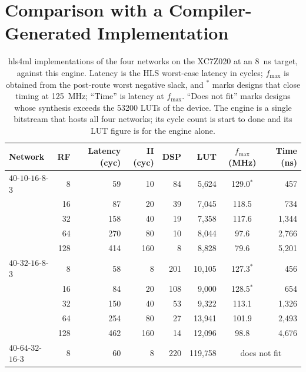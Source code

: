 \documentclass[final,5p,times,twocolumn]{elsarticle}
\begin{document}
\section{Comparison with a Compiler-Generated Implementation}
\label{sec:hls4ml}
\begin{table}[t]
\centering
\caption{hls4ml implementations of the four networks on the XC7Z020 at an
\SI{8}{\nano\second} target, against this engine. Latency is the HLS worst-case
latency in cycles; $f_{\max}$ is obtained from the post-route worst negative
slack, and $^{\ast}$ marks designs that close timing at
\SI{125}{\mega\hertz}; ``Time'' is latency at $f_{\max}$. ``Does not fit'' marks
designs whose synthesis exceeds the \num{53200} LUTs of the device. The engine
is a single bitstream that hosts all four networks; its cycle count is start to
done and its LUT figure is for the engine alone.}
\label{tab:hls4ml}
\small
\begin{tabular}{@{}lrrrrrcr@{}}
\toprule
Network & RF & Latency (cyc) & II (cyc) & DSP & LUT & $f_{\max}$ (MHz) & Time (ns) \\
\midrule
$40$-$10$-$16$-$8$-$3$ & 8   & 59  & 10  & 84  & 5{,}624  & 129.0$^{\ast}$ & 457 \\
                       & 16  & 87  & 20  & 39  & 7{,}045  & 118.5 & 734 \\
                       & 32  & 158 & 40  & 19  & 7{,}358  & 117.6 & 1{,}344 \\
                       & 64  & 270 & 80  & 10  & 8{,}044  & 97.6  & 2{,}766 \\
                       & 128 & 414 & 160 & 8   & 8{,}828  & 79.6  & 5{,}201 \\
\addlinespace
$40$-$32$-$16$-$8$-$3$ & 8   & 58  & 8   & 201 & 10{,}105 & 127.3$^{\ast}$ & 456 \\
                       & 16  & 84  & 20  & 108 & 9{,}000  & 128.5$^{\ast}$ & 654 \\
                       & 32  & 150 & 40  & 53  & 9{,}322  & 113.1 & 1{,}326 \\
                       & 64  & 254 & 80  & 27  & 13{,}941 & 101.9 & 2{,}493 \\
                       & 128 & 462 & 160 & 14  & 12{,}096 & 98.8  & 4{,}676 \\
\addlinespace
$40$-$64$-$32$-$16$-$3$ & 8   & 60  & 8   & 220 & 119{,}758 & \multicolumn{2}{c}{does not fit} \\

\end{tabular}
\end{table}
\end{document}
